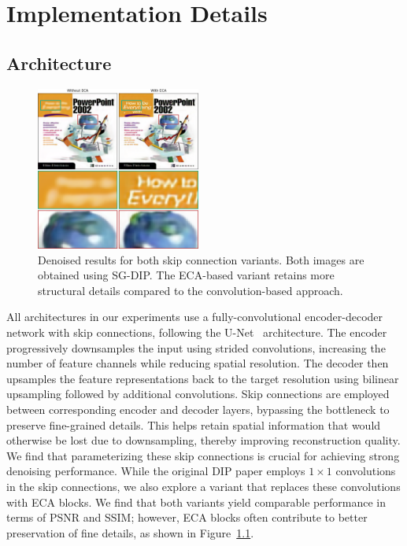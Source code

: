 \chapter{Implementation Details}

\section{Architecture}

\begin{figure}
    \vspace{-12pt}
    \centering
    \includegraphics[width=0.48\textwidth]{img/fig_5.1.png}
    \caption{
        Denoised results for both skip connection variants.
        Both images are obtained using SG-DIP\@.
        The ECA-based variant retains more structural details compared to the convolution-based approach.
    }\label{fig:ECA}
\end{figure}
All architectures in our experiments use a fully-convolutional encoder-decoder network with skip connections, following the U-Net~\cite{U-Net} architecture.
The encoder progressively downsamples the input using strided convolutions, increasing the number of feature channels while reducing spatial resolution.
The decoder then upsamples the feature representations back to the target resolution using bilinear upsampling followed by additional convolutions.
Skip connections are employed between corresponding encoder and decoder layers, bypassing the bottleneck to preserve fine-grained details.
This helps retain spatial information that would otherwise be lost due to downsampling, thereby improving reconstruction quality.
We find that parameterizing these skip connections is crucial for achieving strong denoising performance.
While the original DIP paper employs $1 \times 1$ convolutions in the skip connections, we also explore a variant that replaces these convolutions with ECA blocks.
We find that both variants yield comparable performance in terms of PSNR and SSIM\@; however, ECA blocks often contribute to better preservation of fine details, as shown in Figure~\ref{fig:ECA}.

